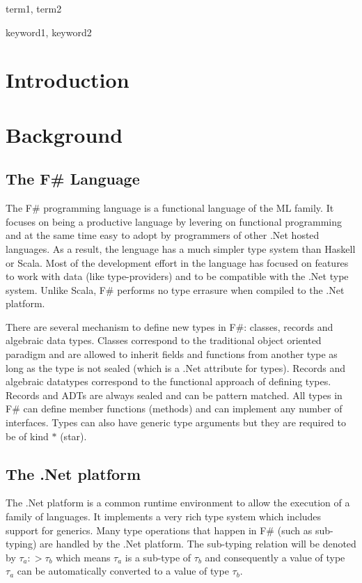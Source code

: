 \documentclass{sigplanconf}
\begin{document}
\terms
term1, term2

\keywords
keyword1, keyword2

\section{Introduction}

\section{Background}
\subsection{The F\# Language}
The F\# programming language is a functional language of the ML family. It focuses on being a productive language by levering on functional programming and at the same time easy to adopt by programmers of other .Net hosted languages. As a result, the lenguage has a much simpler type system than Haskell or Scala. Most of the development effort in the language has focused on features to work with data (like type-providers) and to be compatible with the .Net type system. Unlike Scala, F\# performs no type errasure when compiled to the .Net platform.

There are several mechanism to define new types in F\#: classes, records and algebraic data types. Classes correspond to the traditional object oriented paradigm and are allowed to inherit fields and functions from another type as long as the type is not sealed (which is a .Net attribute for types). Records and algebraic datatypes correspond to the functional approach of defining types. Records and ADTs are always sealed and can be pattern matched. All types in F\# can define member functions (methods) and can implement any number of interfaces. Types can also have generic type arguments but they are required to be of kind $*$ (star).
\subsection{The .Net platform}
The .Net platform is a common runtime environment to allow the execution of a family of languages. It implements a very rich type system which includes support for generics. Many type operations that happen in F\# (such as sub-typing) are handled by the .Net platform. The sub-typing relation will be denoted by $\tau_a :> \tau_b$ which means $\tau_a$ is a sub-type of $\tau_b$ and consequently a value of type $\tau_a$ can be automatically converted to a value of type $\tau_b$.
\end{document}
